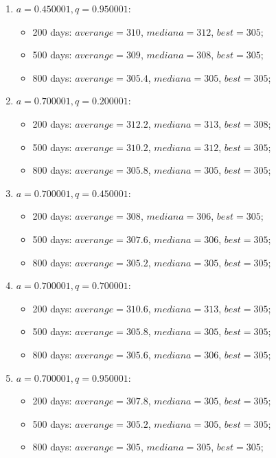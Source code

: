 \begin{enumerate}
\begin{enumerate}
\begin{itemize}
		\end{itemize}
		\item $a= 0.450001, q= 0.950001$:
		\begin{itemize}
			\item 200 days: $averange = 310$, $mediana = 312$, $best = 305$;
			\item 500 days: $averange = 309$, $mediana = 308$, $best = 305$;
			\item 800 days: $averange = 305.4$, $mediana = 305$, $best = 305$;
		\end{itemize}
		\item $a= 0.700001, q= 0.200001$:
		\begin{itemize}
			\item 200 days: $averange = 312.2$, $mediana = 313$, $best = 308$;
			\item 500 days: $averange = 310.2$, $mediana = 312$, $best = 305$;
			\item 800 days: $averange = 305.8$, $mediana = 305$, $best = 305$;
		\end{itemize}
		\item $a= 0.700001, q= 0.450001$:
		\begin{itemize}
			\item 200 days: $averange = 308$, $mediana = 306$, $best = 305$;
			\item 500 days: $averange = 307.6$, $mediana = 306$, $best = 305$;
			\item 800 days: $averange = 305.2$, $mediana = 305$, $best = 305$;
		\end{itemize}
		\item $a= 0.700001, q= 0.700001$:
		\begin{itemize}
			\item 200 days: $averange = 310.6$, $mediana = 313$, $best = 305$;
			\item 500 days: $averange = 305.8$, $mediana = 305$, $best = 305$;
			\item 800 days: $averange = 305.6$, $mediana = 306$, $best = 305$;
		\end{itemize}
		\item $a= 0.700001, q= 0.950001$:
		\begin{itemize}
			\item 200 days: $averange = 307.8$, $mediana = 305$, $best = 305$;
			\item 500 days: $averange = 305.2$, $mediana = 305$, $best = 305$;
			\item 800 days: $averange = 305$, $mediana = 305$, $best = 305$;
		\end{itemize}

\end{enumerate}
\end{enumerate}
